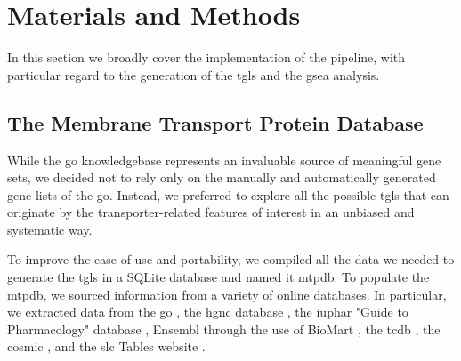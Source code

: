 \section{Materials and Methods}

In this section we broadly cover the implementation of the pipeline, with particular regard to the generation of the \glspl{tgl} and the \gls{gsea} analysis.

\subsection{The Membrane Transport Protein Database}
While the \gls{go} knowledgebase \cite{ashburnerGeneOntologyTool2000, thegeneontologyconsortiumGeneOntologyKnowledgebase2023} represents an invaluable source of meaningful gene sets, we decided not to rely only on the manually and automatically generated gene lists of the \gls{go}. Instead, we preferred to explore all the possible \glspl{tgl} that can originate by the transporter-related features of interest in an unbiased and systematic way.

To improve the ease of use and portability, we compiled all the data we needed to generate the \glspl{tgl} in a SQLite database and named it \gls{mtpdb}. To populate the \gls{mtpdb}, we sourced information from a variety of online databases. In particular, we extracted data from the \gls{go} \cite{ashburnerGeneOntologyTool2000, thegeneontologyconsortiumGeneOntologyKnowledgebase2023}, the \gls{hgnc} database \cite{sealGenenamesOrgHGNC2023}, the \gls{iuphar} "Guide to Pharmacology" database \cite{hardingIUPHARBPSGuide2022}, Ensembl \cite{cunninghamEnsembl20222022} through the use of BioMart \cite{smedleyBioMartBiologicalQueries2009}, the \gls{tcdb} \cite{saierTransporterClassificationDatabase2021}, the \gls{cosmic} \cite{tateCOSMICCatalogueSomatic2019}, and the \gls{slc} Tables website  \cite{hedigerABCsMembraneTransporters2013}.

